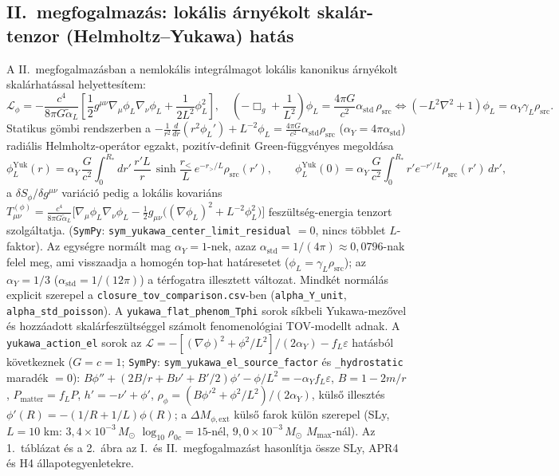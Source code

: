 \documentclass[10pt,a4paper]{article}
\begin{document}
\subsection{II.\ megfogalmazás: lokális árnyékolt skalár-tenzor (Helmholtz--Yukawa) hatás}
A II.\ megfogalmazásban a nemlokális integrálmagot lokális kanonikus árnyékolt skalárhatással helyettesítem:
\begin{equation}
  \mathcal{L}_\phi = -\frac{c^4}{8\pi G \tilde{\alpha}_L}\!\left[\frac{1}{2}g^{\mu\nu}\nabla_\mu\phi_L\nabla_\nu\phi_L + \frac{1}{2L^2}\phi_L^2\right], \quad \left(-\Box_g + \frac{1}{L^2}\right)\phi_L = \frac{4\pi G}{c^2}\alpha_{\text{std}}\,\rho_{\text{src}} \iff (-L^2\nabla^2+1)\phi_L = \alpha_Y\gamma_L\rho_{\text{src}}.
\end{equation}
Statikus gömbi rendszerben a $-\frac{1}{r^2}\frac{d}{dr}(r^2\phi_L') + L^{-2}\phi_L = \frac{4\pi G}{c^2}\alpha_{\text{std}}\rho_{\text{src}}$ ($\alpha_Y = 4\pi\alpha_{\text{std}}$) radiális Helmholtz-operátor egzakt, pozitív-definit Green-függvényes megoldása
\begin{equation}
  \phi_L^{\text{Yuk}}(r) = \alpha_Y\,\frac{G}{c^2}\int_0^{R_*} dr'\,\frac{r' L}{r}\,\sinh\!\frac{r_<}{L}\,e^{-r_>/L}\rho_{\text{src}}(r'), \qquad \phi_L^{\text{Yuk}}(0) = \alpha_Y\,\frac{G}{c^2}\int_0^{R_*} r' e^{-r'/L}\rho_{\text{src}}(r')\,dr',
\end{equation}
a $\delta S_\phi/\delta g^{\mu\nu}$ variáció pedig a lokális kovariáns $T_{\mu\nu}^{(\phi)} = \frac{c^4}{8\pi G\tilde{\alpha}_L}\bigl[\nabla_\mu\phi_L\nabla_\nu\phi_L - \frac{1}{2}g_{\mu\nu}\bigl((\nabla\phi_L)^2 + L^{-2}\phi_L^2\bigr)\bigr]$ feszültség-energia tenzort szolgáltatja. (\texttt{SymPy}: \texttt{sym\_yukawa\_center\_limit\_residual} $=0$, nincs többlet $L$-faktor). Az egységre normált mag $\alpha_Y = 1$-nek, azaz $\alpha_{\text{std}} = 1/(4\pi)\approx 0{,}0796$-nak felel meg, ami visszaadja a homogén top-hat határesetet ($\phi_L = \gamma_L\rho_{\text{src}}$); az $\alpha_Y = 1/3$ ($\alpha_{\text{std}} = 1/(12\pi)$) a térfogatra illesztett változat. Mindkét normálás explicit szerepel a \texttt{closure\_tov\_comparison.csv}-ben (\texttt{alpha\_Y\_unit}, \texttt{alpha\_std\_poisson}). A \texttt{yukawa\_flat\_phenom\_Tphi} sorok síkbeli Yukawa-mezővel és hozzáadott skalárfeszültséggel számolt fenomenológiai TOV-modellt adnak. A \texttt{yukawa\_action\_el} sorok az $\mathcal{L}=-[(\nabla\phi)^2+\phi^2/L^2]/(2\alpha_Y)-f_L\varepsilon$ hatásból következnek ($G=c=1$; \texttt{SymPy}: \texttt{sym\_yukawa\_el\_source\_factor} és \texttt{\_hydrostatic} maradék $=0$): $B\phi''+(2B/r+B\nu'+B'/2)\phi'-\phi/L^2=-\alpha_Y f_L\varepsilon$, $B=1-2m/r$, $P_{\text{matter}}=f_LP$, $h'=-\nu'+\phi'$, $\rho_\phi=(B\phi'^2+\phi^2/L^2)/(2\alpha_Y)$, külső illesztés $\phi'(R)=-(1/R+1/L)\phi(R)$; a $\Delta M_{\phi,\text{ext}}$ külső farok külön szerepel (SLy, $L=10$ km: $3{,}4\times 10^{-3}\,M_\odot$ $\log_{10}\rho_{0c}=15$-nél, $9{,}0\times 10^{-3}\,M_\odot$ $M_{\max}$-nál). Az 1.\ táblázat és a 2.\ ábra az I.\ és II.\ megfogalmazást hasonlítja össze SLy, APR4 és H4 állapotegyenletekre.
\end{document}
